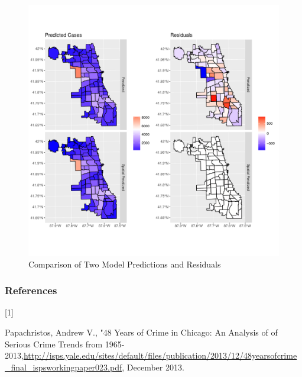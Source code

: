 \documentclass{article} %
\begin{document}
\begin{center}
\begin{figure}[ht]
\includegraphics[width = \textwidth]{Plots/results}
\caption{Comparison of Two Model Predictions and Residuals}
\label{fig:spatialplots}
\end{figure}
\end{center}







\clearpage\newpage


\subsubsection*{References}


\hypertarget{Ref1}{[1]} Papachristos, Andrew V., "48 Years of Crime in Chicago: An Analysis of of Serious Crime Trends from 1965-2013,\url{http://isps.yale.edu/sites/default/files/publication/2013/12/48yearsofcrime_final_ispsworkingpaper023.pdf}, December 2013.
\end{document}
